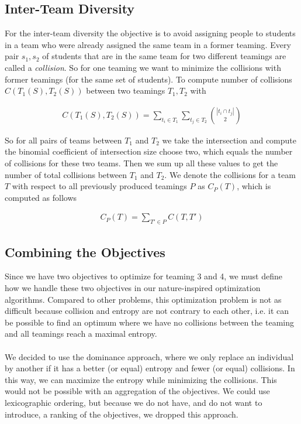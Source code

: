 \documentclass[12pt,a4paper]{article}
\begin{document}
\subsection{Inter-Team Diversity}
\label{sec:inter-team}
For the inter-team diversity the objective is to avoid assigning people to students in a team who were already assigned the same team in a former teaming. Every pair $s_1, s_2$ of students that are in the same team for two different teamings are called a \emph{collision}. So for one teaming we want to minimize the collisions with former teamings (for the same set of students). To compute number of collisions $C(T_1(S), T_2(S))$ between two teamings $T_1, T_2$ with

\begin{align*}
    C(T_1(S), T_2(S)) = \sum_{t_i \in T_1} \sum_{t_j \in T_2} \binom{|t_i \cap t_j|}{2}
\end{align*}

So for all pairs of teams between $T_1$ and $T_2$ we take the intersection and compute the binomial coefficient of intersection size choose two, which equals the number of collisions for these two teams. Then we sum up all these values to get the number of total collisions between $T_1$ and $T_2$. We denote the collisions for a team $T$ with respect to all previously produced teamings $P$ as $C_P(T)$, which is computed as follows

\begin{align*}
    C_P(T) = \sum_{T' \in P} C(T, T')
\end{align*}

\subsection{Combining the Objectives}
\label{sec:combining-objectives}
Since we have two objectives to optimize for teaming 3 and 4, we must define how we handle these two objectives in our nature-inspired optimization algorithms. Compared to other problems, this optimization problem is not as difficult because collision and entropy are not contrary to each other, i.e. it can be possible to find an optimum where we have no collisions between the teaming and all teamings reach a maximal entropy.\\
\\
We decided to use the dominance approach, where we only replace an individual by another if it has a better (or equal) entropy and fewer (or equal) collisions. In this way, we can maximize the entropy while minimizing the collisions. This would not be possible with an aggregation of the objectives. We could use lexicographic ordering, but because we do not have, and do not want to introduce, a ranking of the objectives, we dropped this approach.
\end{document}
